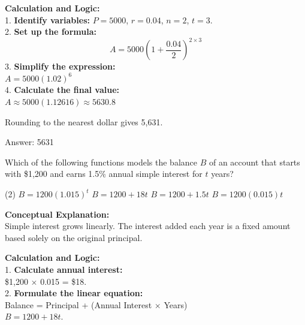 \documentclass[11pt,paper=a4,answers]{exam}
\begin{document}
\begin{questions}
\begin{solution}
\vspace{30pt}

\textbf{Calculation and Logic:} \\
1. \textbf{Identify variables:} $P = 5000$, $r = 0.04$, $n = 2$, $t = 3$. \\
2. \textbf{Set up the formula:} \\
   \[ A = 5000(1 + \frac{0.04}{2})^{2 \times 3} \]
3. \textbf{Simplify the expression:} \\
   $A = 5000(1.02)^6$ \\
4. \textbf{Calculate the final value:} \\
   $A \approx 5000(1.12616) \approx 5630.8$

\vspace{15pt}

Rounding to the nearest dollar gives 5,631.

\vspace{30pt}

Answer: \colorbox{yellow!100}{5631}
\end{solution}

\vspace{60pt}

\question
Which of the following functions models the balance $B$ of an account that starts with \$1,200 and earns 1.5\% annual simple interest for $t$ years?
\begin{tasks}(2)
    \task $B = 1200(1.015)^t$
    \task $B = 1200 + 18t$
    \task $B = 1200 + 1.5t$
    \task $B = 1200(0.015)t$
\end{tasks}

\begin{solution}
\textbf{Conceptual Explanation:} \\
Simple interest grows linearly. The interest added each year is a fixed amount based solely on the original principal.

\vspace{30pt}

\textbf{Calculation and Logic:} \\
1. \textbf{Calculate annual interest:} \\
   \$1,200 $\times$ 0.015 = \$18. \\
2. \textbf{Formulate the linear equation:} \\
   Balance = Principal + (Annual Interest $\times$ Years) \\
   $B = 1200 + 18t$.


\end{solution}
\end{questions}
\end{document}
